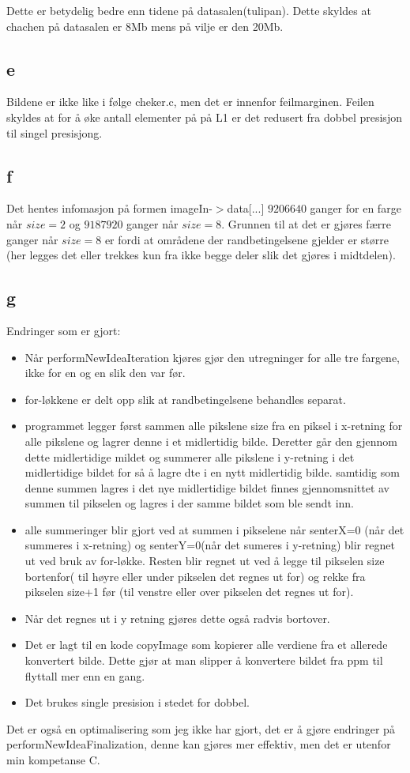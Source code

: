\documentclass[12pt, a4paper]{article} %
\begin{document}
Dette er betydelig bedre enn tidene på datasalen(tulipan). Dette skyldes at chachen på datasalen er 8Mb mens på vilje er den 20Mb. 

\subsection*{e}
Bildene er ikke like i følge cheker.c, men det er innenfor feilmarginen. Feilen skyldes at for å øke antall elementer på på L1 er det redusert fra dobbel presisjon til singel presisjong.

\subsection*{f}
Det hentes infomasjon på formen imageIn-$>$data[...] $9206640$ ganger for en farge når $size=2$ og $9187920  $ ganger når $size=8$. Grunnen til at det er gjøres færre ganger når $size=8$ er fordi at områdene der randbetingelsene gjelder er større (her legges det eller trekkes kun fra ikke begge deler slik det gjøres i midtdelen).


\subsection*{g}
Endringer som er gjort:
\begin{itemize}
\item Når performNewIdeaIteration kjøres gjør den utregninger for alle tre fargene, ikke for en og en slik den var før.
\item for-løkkene er delt opp slik at randbetingelsene behandles separat.
\item programmet legger først sammen alle pikslene size fra en piksel i x-retning for alle pikslene og lagrer denne i et midlertidig bilde. Deretter går den gjennom dette midlertidige mildet og summerer alle pikslene i y-retning i det midlertidige bildet for så å lagre dte i en nytt midlertidig bilde. samtidig som denne summen lagres i det nye midlertidige bildet finnes gjennomsnittet av summen til pikselen og lagres i der samme bildet som ble sendt inn. 
\item alle summeringer blir gjort ved at summen i pikselene når senterX=0 (når det summeres i x-retning) og senterY=0(når det sumeres i y-retning) blir regnet ut ved bruk av for-løkke. Resten blir regnet ut ved å legge til pikselen size bortenfor( til høyre eller under pikselen det regnes ut for) og rekke fra pikselen size+1 før (til venstre eller over pikselen det regnes ut for).
\item Når det regnes ut i y retning gjøres dette også radvis bortover. 
\item Det er lagt til en kode copyImage som kopierer alle verdiene fra et allerede konvertert bilde. Dette gjør at man slipper å konvertere bildet fra ppm til flyttall mer enn en gang.
\item Det brukes single presision i stedet for dobbel. 
\end{itemize}

Det er også en optimalisering som jeg ikke har gjort, det er å gjøre endringer på performNewIdeaFinalization, denne kan gjøres mer effektiv, men det er utenfor min kompetanse  C.
\end{document}
